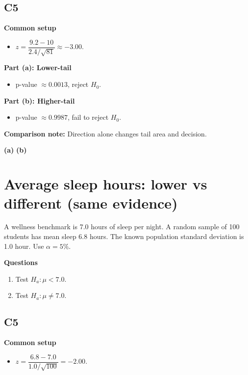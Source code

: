 \subsection*{C5}
\textbf{Common setup}
\begin{itemize}
    \item \(z=\dfrac{9.2-10}{2.4/\sqrt{81}}\approx -3.00\).
\end{itemize}

\textbf{Part (a): Lower-tail}
\begin{itemize}
    \item p-value \(\approx0.0013\), reject \(H_0\).
\end{itemize}

\textbf{Part (b): Higher-tail}
\begin{itemize}
    \item p-value \(\approx0.9987\), fail to reject \(H_0\).
\end{itemize}

\textbf{Comparison note:} Direction alone changes tail area and decision.

\begin{center}
\textbf{(a)}\;
\hspace{0.8cm}
\textbf{(b)}\;
\end{center}


\section{Average sleep hours: lower vs different (same evidence)}
A wellness benchmark is 7.0 hours of sleep per night. A random sample of 100 students has mean sleep 6.8 hours. The known population standard deviation is 1.0 hour. Use \(\alpha=5\%\).

\textbf{Questions}
\begin{enumerate}
    \item[(a)] Test \(H_a\colon \mu<7.0\).
    \item[(b)] Test \(H_a\colon \mu\ne7.0\).
\end{enumerate}

\subsection*{C5}
\textbf{Common setup}
\begin{itemize}
    \item \(z=\dfrac{6.8-7.0}{1.0/\sqrt{100}}=-2.00\).
\end{itemize}

